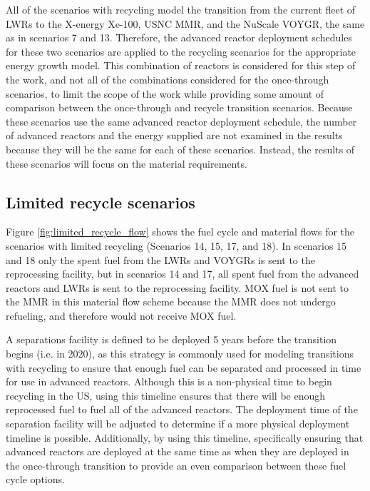 All of the scenarios with recycling model the transition from the 
current fleet of \glspl{LWR} to the X-energy Xe-100, \gls{USNC} \gls{MMR}, 
and the NuScale VOYGR, the same as in scenarios 7 and 13. Therefore, 
the advanced reactor deployment schedules for these two scenarios are applied 
to the recycling scenarios for the appropriate energy growth model. 
This combination 
of reactors is considered for this step of the work, and not all of the 
combinations considered for the once-through scenarios, to limit the scope 
of the work while providing some amount of comparison between the 
once-through and recycle transition scenarios. Because these scenarios 
use the same advanced reactor deployment schedule, the number of 
advanced reactors and the energy supplied are not examined in the 
results because they will be the same for each of these scenarios. Instead, 
the results of these scenarios will focus on the material requirements. 

\subsection{Limited recycle scenarios}
Figure \ref{fig:limited_recycle_flow} shows the fuel cycle and material flows 
for the scenarios with limited recycling (Scenarios 14, 15, 17, and 18). 
In scenarios 15 and 18 only the spent fuel from the \glspl{LWR} and 
VOYGRs is sent to the reprocessing facility, but in scenarios 14 and 17, 
all spent fuel from the advanced reactors and \glspl{LWR} is sent to the 
reprocessing facility. \gls{MOX} fuel is not sent to the \gls{MMR} in this 
material flow scheme because the \gls{MMR} does not undergo refueling, 
and therefore would not receive \gls{MOX} fuel. 



A separations facility is defined to be deployed 5 
years before the transition 
begins (i.e. in 2020), as this strategy is commonly used for modeling 
transitions with recycling \cite{passerini_systematic_2014,richards_application_2021}
to ensure that enough fuel can be separated and 
processed in time for use in advanced reactors. Although this is a 
non-physical time to begin recycling in the US, using this timeline ensures 
that there will be enough reprocessed fuel to fuel all of the advanced 
reactors. The deployment time of the separation facility will be adjusted 
to determine if a more physical deployment timeline is possible. Additionally, 
by using this timeline, specifically ensuring that advanced reactors 
are deployed at the same time as when they are deployed in the once-through 
transition to provide an even comparison between these fuel cycle options.

